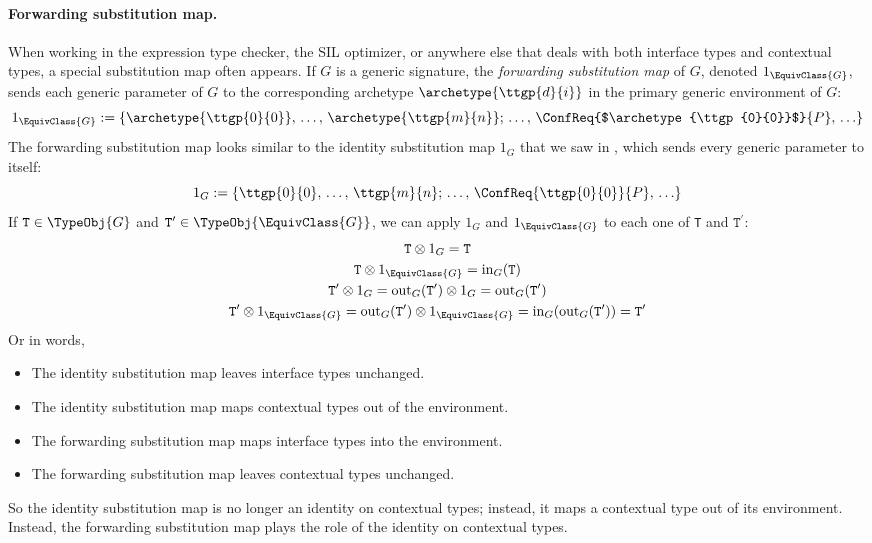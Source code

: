 \documentclass[../generics]{subfiles}
\begin{document}
\paragraph{Forwarding substitution map.} When working in the expression type checker, the SIL optimizer, or anywhere else that deals with both interface types and contextual types, a special substitution map often appears. If $G$ is a generic signature, the \emph{forwarding substitution map} of $G$, denoted $1_{\EquivClass{G}}$, sends each generic parameter  of $G$ to the corresponding archetype $\archetype{\ttgp{d}{i}}$ in the primary generic environment of $G$:
\[1_{\EquivClass{G}}:=\{\archetype{\ttgp{0}{0}},\,\ldots,\,\archetype{\ttgp{m}{n}};\,\ldots,\,\ConfReq{$\archetype{\ttgp{0}{0}}$}{P},\,\ldots\}\]
The forwarding substitution map looks similar to the identity substitution map $1_G$ that we saw in , which sends every generic parameter to itself:
\[1_{G}:=\{\ttgp{0}{0},\,\ldots,\,\ttgp{m}{n};\,\ldots,\,\ConfReq{\ttgp{0}{0}}{P},\,\ldots\}\]
If $\texttt{T}\in\TypeObj{G}$ and $\texttt{T}^\prime\in\TypeObj{\EquivClass{G}}$, we can apply $1_G$ and $1_{\EquivClass{G}}$ to each one of \texttt{T} and $\texttt{T}^\prime$:
\begin{gather*}
\texttt{T}\otimes 1_G=\texttt{T}\\
\texttt{T}\otimes 1_{\EquivClass{G}}=\mathrm{in}_G(\texttt{T})\\
\texttt{T}^\prime\otimes 1_G=\mathrm{out}_G(\texttt{T}^\prime)\otimes 1_G=\mathrm{out}_G(\texttt{T}^\prime)\\
\texttt{T}^\prime\otimes 1_{\EquivClass{G}}=\mathrm{out}_G(\texttt{T}^\prime)\otimes 1_{\EquivClass{G}}=\mathrm{in}_G(\mathrm{out}_G(\texttt{T}^\prime))=\texttt{T}^\prime
\end{gather*}
Or in words,
\begin{itemize}
\item The identity substitution map leaves interface types unchanged.
\item The identity substitution map maps contextual types out of the environment.
\item The forwarding substitution map maps interface types into the environment.
\item The forwarding substitution map leaves contextual types unchanged.
\end{itemize}
So the identity substitution map is no longer an identity on contextual types; instead, it maps a contextual type out of its environment. Instead, the forwarding substitution map plays the role of the identity on contextual types.
\end{document}

